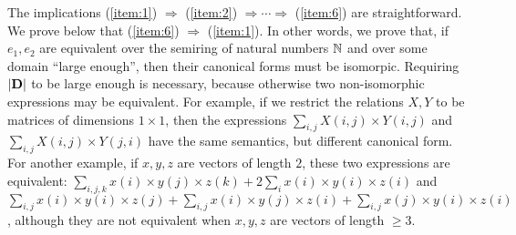 The implications (\ref{item:1}) $\Rightarrow$ (\ref{item:2}) $\Rightarrow\cdots\Rightarrow$ (\ref{item:6}) are straightforward.  We prove below that (\ref{item:6}) $\Rightarrow$ (\ref{item:1}).  In other words, we prove that, if $e_1, e_2$ are equivalent over the semiring of natural numbers $\mathbb N$ and over some domain ``large enough'', then their canonical forms must be isomorpic.  Requiring $|\mathbf D|$ to be large enough is necessary, because otherwise two non-isomorphic expressions may be equivalent. For example, if we restrict the relations $X, Y$ to be matrices of dimensions $1 \times 1$, then the expressions $\sum_{i,j} X(i,j) \times Y(i,j)$ and $\sum_{i,j} X(i,j) \times Y(j,i)$ have the same semantics, but different canonical form.  For another example, if $x,y,z$ are vectors of length $2$, these two expressions are equivalent: $\sum_{i,j,k} x(i) \times y(j) \times z(k)+2\sum_i x(i)\times y(i)\times z(i)$ and $\sum_{i,j}x(i)\times y(i)\times z(j)+\sum_{i,j}x(i)\times y(j)\times z(i)+\sum_{i,j}x(j)\times y(i)\times z(i)$, although they are not equivalent when $x,y,z$ are vectors of length $\geq 3$.

